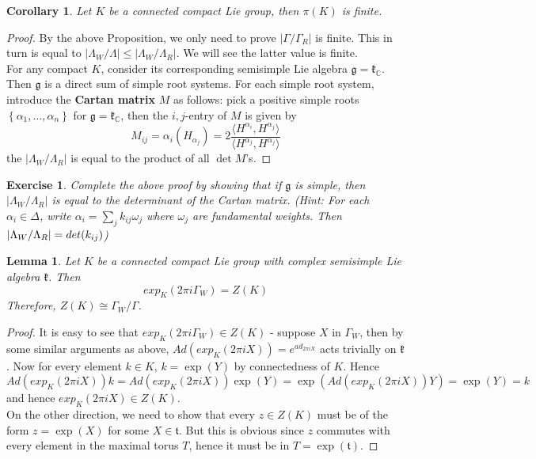 \documentclass[11pt]{book}
\newtheorem{corollary}[theorem]{Corollary}
\newtheorem{lemma}[theorem]{Lemma}
\newtheorem{exercise}[theorem]{Exercise}
\newcommand{\bb}[1]{\mathbb{#1}}
\newcommand{\mf}[1]{\mathfrak{#1}}
\begin{document}
\begin{corollary}
Let $K$ be a connected compact Lie group, then $\pi(K)$ is finite.
\end{corollary}
\begin{proof}
By the above Proposition, we only need to prove $|\Gamma/\Gamma_R|$ is finite. This in turn is equal to $|\Lambda_W/\Lambda| \leq |\Lambda_W/\Lambda_R|$. We will see the latter value is finite.\\
For any compact $K$, consider its corresponding semisimple Lie algebra $\mf{g} = \mf{k}_{\bb{C}}$. Then $\mf{g}$ is a direct sum of simple root systems. For each simple root system, introduce the \textbf{Cartan matrix} $M$ as follows: pick a positive simple roots $\left\{\alpha_1,\dots,\alpha_n\right\}$ for $\mf{g} = \mf{k}_{\bb{C}}$, then the $i,j$-entry of $M$ is given by
$$ M_{ij} = \alpha_i(H_{\alpha_j}) = 2 \frac{ \langle H^{\alpha_i}, H^{\alpha_j} \rangle}{\langle H^{\alpha_j}, H^{\alpha_j} \rangle}$$
the $|\Lambda_W/\Lambda_R|$ is equal to the product of all $\det M$'s.
\end{proof}
\begin{exercise}
Complete the above proof by showing that if $\mf{g}$ is simple, then $|\Lambda_W/\Lambda_R|$ is equal to the determinant of the Cartan matrix.
(Hint: For each $\alpha_i \in \Delta$, write $\alpha_i = \sum_j k_{ij}\omega_j$ where $\omega_j$ are fundamental weights. Then $|\Lambda_W/\Lambda_R| = \\det(k_{ij})$)
\end{exercise}


\begin{lemma}
Let $K$ be a connected compact Lie group with complex semisimple Lie algebra $\mf{k}$. Then
$$exp_K(2\pi i \Gamma_W) = Z(K)$$
Therefore, $Z(K) \cong \Gamma_W/\Gamma$.
\end{lemma}
\begin{proof}
It is easy to see that $exp_K(2 \pi i \Gamma_W) \in Z(K)$ - suppose $X$ in $\Gamma_W$, then by some similar arguments as above, $Ad(exp_K(2 \pi i X)) = e^{ad_{2\pi i X}}$ acts trivially on $\mf{k}$. Now for every element $k \in K$, $k = \exp(Y)$ by connectedness of $K$. Hence
$$Ad(exp_K(2\pi i X))k = Ad(exp_K(2\pi i X))\exp(Y) =  \exp(Ad(exp_K(2 \pi i X))Y) = \exp(Y) = k$$
and hence $exp_K(2 \pi iX) \in Z(K)$.\\
On the other direction, we need to show that every $z \in Z(K)$ must be of the form $z = \exp(X)$ for some $X \in \mf{t}$. But this is obvious since $z$ commutes with every element in the maximal torus $T$, hence it must be in $T = \exp(\mf{t})$.
\end{proof}
\end{document}
